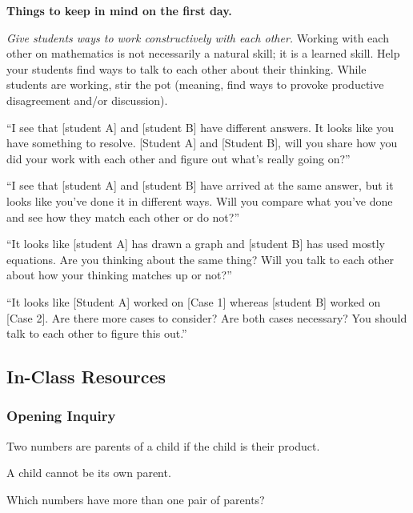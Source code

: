 \documentclass[11pt]{article}
\newenvironment{bignote}[1][Instructor note]%
	{\begin{mdframed}\raggedright{\bf #1.~}}
	{\end{mdframed}}
\theoremstyle{definition}
\begin{document}
\begin{bignote}[Things to keep in mind on the first day]
\begin{itemize*}
	\item {\it Give students ways to work constructively with each other.} Working with each other on mathematics is not necessarily a natural skill; it is a learned skill. Help your students find ways to talk to each other about their thinking. While students are working, stir the pot (meaning, find ways to provoke productive disagreement and/or discussion). 
		\begin{itemize*}
		\item ``I see that [student A] and [student B] have different answers. It looks like you have something to resolve. [Student A] and [Student B], will you share how you did your work with each other and figure out what's really going on?'' 
		\item ``I see that [student A] and [student B] have arrived at the same answer, but it looks like you've done it in different ways. Will you compare what you've done and see how they match each other or do not?'' 
		\item ``It looks like [student A] has drawn a graph and [student B] has used mostly equations. Are you thinking about the same thing? Will you talk to each other about how your thinking matches up or not?'' 
		\item ``It looks like [Student A] worked on [Case 1] whereas [student B] worked on [Case 2]. Are there more cases to consider? Are both cases necessary? You should talk to each other to figure this out.''
		\end{itemize*}
	\end{itemize*}
\end{bignote}


\newpage \subsection{In-Class Resources}  

\subsubsection{Opening Inquiry}

Two numbers are parents of a child if the child is their product. 

A child cannot be its own parent.

Which numbers have more than one pair of parents?
\end{document}
